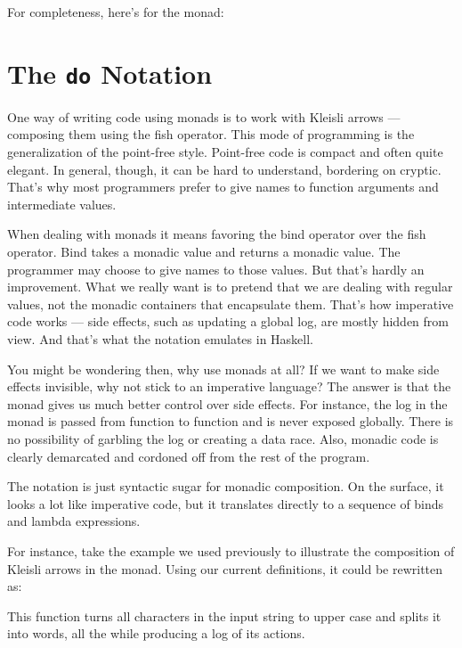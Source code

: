 For completeness, here's  for the  monad:


\section{The \texttt{do} Notation}

One way of writing code using monads is to work with Kleisli arrows ---
composing them using the fish operator. This mode of programming is the
generalization of the point-free style. Point-free code is compact and
often quite elegant. In general, though, it can be hard to understand,
bordering on cryptic. That's why most programmers prefer to give names
to function arguments and intermediate values.

When dealing with monads it means favoring the bind operator over the
fish operator. Bind takes a monadic value and returns a monadic value.
The programmer may choose to give names to those values. But that's
hardly an improvement. What we really want is to pretend that we are
dealing with regular values, not the monadic containers that encapsulate
them. That's how imperative code works --- side effects, such as
updating a global log, are mostly hidden from view. And that's what the
 notation emulates in Haskell.

You might be wondering then, why use monads at all? If we want to make
side effects invisible, why not stick to an imperative language? The
answer is that the monad gives us much better control over side effects.
For instance, the log in the  monad is passed from
function to function and is never exposed globally. There is no
possibility of garbling the log or creating a data race. Also, monadic
code is clearly demarcated and cordoned off from the rest of the
program.

The  notation is just syntactic sugar for monadic
composition. On the surface, it looks a lot like imperative code, but it
translates directly to a sequence of binds and lambda expressions.

For instance, take the example we used previously to illustrate the
composition of Kleisli arrows in the  monad. Using our
current definitions, it could be rewritten as:

This function turns all characters in the input string to upper case and
splits it into words, all the while producing a log of its actions.

